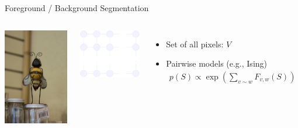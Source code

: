 \documentclass[mathserif]{beamer}
\begin{document}
\begin{frame}{Foreground / Background Segmentation}
\vspace{0.5em}
\begin{columns}[c]
\centering
\includegraphics[width=1.85in]{figures/bee.jpg}

\includegraphics[width=1.8in]{figures/grid.pdf}

\vspace{1em}
\begin{itemize}
\item Set of all pixels: $V$
\vspace{0.5em}
\item Pairwise models (e.g., Ising)
\vspace{-0.5em}
\begin{align*}
p(S) \propto \exp\left(\sum_{v \sim w} F_{v, w}(S) \right)
\end{align*}
\end{itemize}
\end{columns}
\end{frame}
\end{document}
